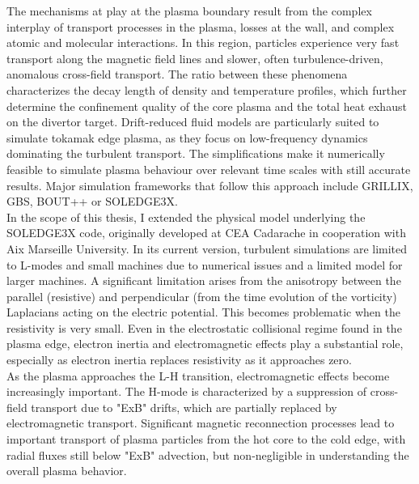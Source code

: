 The mechanisms at play at the plasma boundary result from the complex interplay of transport processes in the plasma, losses at the wall, and complex atomic and molecular interactions. In this region, particles experience very fast transport along the magnetic field lines and slower, often turbulence-driven, anomalous cross-field transport\cite{loarte2007}. The ratio between these phenomena characterizes the decay length of density and temperature profiles, which further determine the confinement quality of the core plasma and the total heat exhaust on the divertor target. Drift-reduced fluid models are particularly suited to simulate tokamak edge plasma, as they focus on low-frequency dynamics dominating the turbulent transport. The simplifications make it numerically feasible to simulate plasma behaviour over relevant time scales with still accurate results. Major simulation frameworks that follow this approach include GRILLIX\cite{GrillixGeneralPaper,stegmeir2019}, GBS\cite{Ricci_2012,giacomin2022gbs}, BOUT++\cite{DUDSON_2009,dudson2015} or SOLEDGE3X\cite{tamain2016tokam3x,Bufferand_2021}. \\

In the scope of this thesis, I extended the physical model underlying the SOLEDGE3X code, originally developed at CEA Cadarache in cooperation with Aix Marseille University. In its current version, turbulent simulations are limited to L-modes and small machines due to numerical issues and a limited model for larger machines. A significant limitation arises from the anisotropy between the parallel (resistive) and perpendicular (from the time evolution of the vorticity) Laplacians acting on the electric potential. This becomes problematic when the resistivity is very small. Even in the electrostatic collisional regime found in the plasma edge, electron inertia and electromagnetic effects play a substantial role, especially as electron inertia replaces resistivity as it approaches zero. \\

As the plasma approaches the L-H transition, electromagnetic effects become increasingly important. The H-mode is characterized by a suppression of cross-field transport due to "ExB" drifts, which are partially replaced by electromagnetic transport. Significant magnetic reconnection processes lead to important transport of plasma particles from the hot core to the cold edge, with radial fluxes still below "ExB" advection, but non-negligible in understanding the overall plasma behavior. \\

